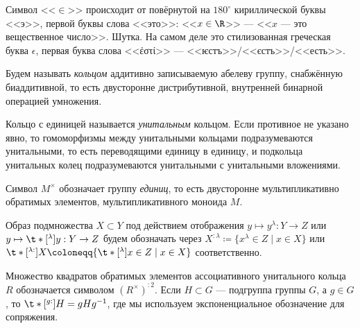 \documentclass[
	extrafontsizes,
	11pt,
	hyphens,
]{memoir}
\begin{document}
\begin{remark}
Символ <<\(\in\)>> происходит от повёрнутой на \(180^{\circ}\) кириллической буквы <<э>>, первой буквы слова <<это>>: <<\(x \in \R\)>> --- <<\(x\) --- это вещественное число>>. Шутка. На самом деле это стилизованная греческая буква \(\epsilon\), первая буква слова <<ἐστί>> --- <<ѥстъ>>/<<єстъ>>/<<есть>>.
\end{remark}

\begin{convention} \label{con:Ring}
Будем называть \emph{кольцом} аддитивно записываемую абелеву группу, снабжённую биаддитивной, то есть двусторонне дистрибутивной, внутренней бинарной операцией умножения.
\end{convention}


\begin{convention}
Кольцо с единицей называется \emph{унитальным} кольцом.
\label{con:UnitalRing}
Если противное не указано явно, то гомоморфизмы между унитальными кольцами подразумеваются унитальными,
то есть переводящими единицу в единицу,
и подкольца унитальных колец подразумеваются унитальными с унитальными вложениями.
\end{convention}

\begin{notation}
Символ \(M^\times\) обозначает группу \emph{единиц}, то есть двусторонне мультипликативно обратимых элементов, мультипликативного моноида \(M\).
\end{notation}

\begin{notation}
\label{not:im_exp_not}
Образ подмножества \(X \subset Y\) под действием
отображения
\(y \mapsto y^\lambda : Y \to Z\)
или
\(y \mapsto \t*[^{\lambda}]{y}{} : Y \to Z\)
будем обозначать через
\(X^{:\lambda} \coloneqq \{x^\lambda \in Z \mid x \in X\}\)
или
\(\t*[^{\lambda:}]{X}{} \coloneqq \{\t*[^{\lambda}]{x}{} \in Z \mid x \in X\}\)
соответственно.
\end{notation}

\begin{example}
Множество квадратов обратимых элементов ассоциативного унитального кольца \(R\) обозначается символом \((R^\times)^{:2}\).
Если \(H \subset G\) --- подгруппа группы \(G\), а \(g \in G\), то \(\t*[^{g:}]{H}{} = gHg^{-1}\), где мы используем экспоненциальное обозначение для сопряжения.
\end{example}
\end{document}
